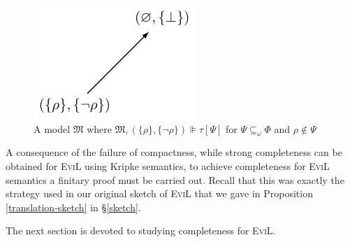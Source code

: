 \begin{figure}[ht]
\centering
  \includegraphics[]{evil_pictures/forth_fig.pdf}
\caption{A model $\mathfrak{M}$ where $\mathfrak{M}, (\{\rho\}, \{\neg
  \rho\}) \VDash \tau[\Psi]$ for $\Psi \subseteq_\omega \Phi$ and $\rho \nin \Psi$}
\label{fig:failureofcompactness}
\end{figure}

A consequence of the failure of compactness, while strong
completeness can be obtained for \textsc{EviL} using Kripke semantics,
to achieve completeness for \textsc{EviL} semantics a finitary proof
must be carried out.  Recall that this was exactly the strategy used
in our original sketch of \textsc{EviL} that we gave in Proposition
\ref{translation-sketch} in \S\ref{sketch}.

The next section is devoted to studying completeness for \textsc{EviL}.


